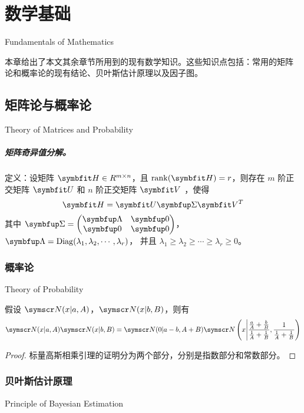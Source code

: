 \documentclass[type=master]{../gdutthesis}
\newcommand{\mbfit}{\symbfit}
\newcommand{\mbf}{\symbfup}
\newcommand{\mscr}{\symscr}
\DeclareMathOperator*{\Diag}{Diag}
\begin{document}
\chapter{数学基础}{Fundamentals of Mathematics}

本章给出了本文其余章节所用到的现有数学知识。这些知识点包括：常用的矩阵
论和概率论的现有结论、贝叶斯估计原理以及因子图。

\section{矩阵论与概率论}{Theory of Matrices and Probability}

\paragraph{矩阵奇异值分解。}

定义：设矩阵 $\mbfit H \in R^{m \times n}$，且 $\rank(\mbfit H) = r$，则存在
$m$ 阶正交矩阵 $\mbfit U$ 和 $n$ 阶正交矩阵 $\mbfit V$ ，使得
\begin{equation}
  \mbfit H = \mbfit U \mbf \Sigma \mbfit V^T
\end{equation}
其中 $\mbf \Sigma = \begin{pmatrix}
  \mbf \Lambda & \mbf 0 \\
  \mbf 0       & \mbf 0
\end{pmatrix}$，
$\mbf \Lambda = \Diag ( \lambda_1, \lambda_2, \cdots, \lambda_r )$，
并且 $\lambda_1 \geqslant \lambda_2 \geqslant \cdots \geqslant \lambda_r \geqslant 0$。

\subsection{概率论}{Theory of Probability}
\begin{lemma}[标量高斯相乘引理]
  假设 $\mscr N ( x | a, A )$，$\mscr N ( x | b, B )$，则有
  \begin{equation}
    \mscr N ( x | a, A ) \mscr N ( x | b, B ) = \mscr N ( 0 | a - b, A + B ) \mscr N \left( x \middle| \frac{ \frac{a}{A} + \frac{b}{B} }{ \frac{1}{A} + \frac{1}{B} }, \frac{ 1 }{ \frac{1}{A} + \frac{1}{B} } \right)
  \end{equation}
\end{lemma}
\begin{proof}
  标量高斯相乘引理的证明分为两个部分，分别是指数部分和常数部分。
\end{proof}

\subsection{贝叶斯估计原理}{Principle of Bayesian Estimation}
\end{document}

